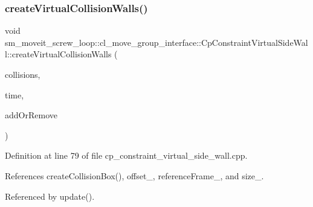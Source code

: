 \subsubsection{\texorpdfstring{create\+Virtual\+Collision\+Walls()}{createVirtualCollisionWalls()}}
{\footnotesize\ttfamily void sm\+\_\+moveit\+\_\+screw\+\_\+loop\+::cl\+\_\+move\+\_\+group\+\_\+interface\+::\+Cp\+Constraint\+Virtual\+Side\+Wall\+::create\+Virtual\+Collision\+Walls (\begin{DoxyParamCaption}\item[{std\+::vector$<$ moveit\+\_\+msgs\+::\+Collision\+Object $>$ \&}]{collisions,  }\item[{const ros\+::\+Time \&}]{time,  }\item[{int}]{add\+Or\+Remove }\end{DoxyParamCaption})}



Definition at line 79 of file cp\+\_\+constraint\+\_\+virtual\+\_\+side\+\_\+wall.\+cpp.



References create\+Collision\+Box(), offset\+\_\+, reference\+Frame\+\_\+, and size\+\_\+.



Referenced by update().


